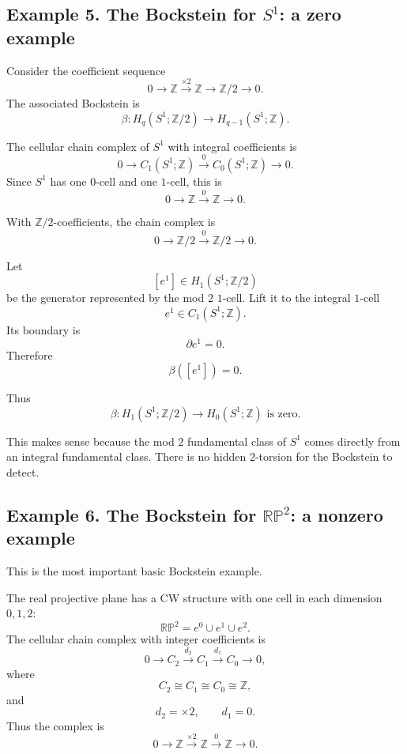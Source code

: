 \documentclass[12pt,a4paper]{article}
\theoremstyle{notespace}
\begin{document}
\subsection{Example 5. The Bockstein for \texorpdfstring{\(S^1\)}{S1}: a zero example}

Consider the coefficient sequence
\[
0\longrightarrow \mathbb Z
\xrightarrow{\times 2}
\mathbb Z
\longrightarrow
\mathbb Z/2
\longrightarrow 0.
\]
The associated Bockstein is
\[
\beta:H_q(S^1;\mathbb Z/2)
\longrightarrow
H_{q-1}(S^1;\mathbb Z).
\]

The cellular chain complex of \(S^1\) with integral coefficients is
\[
0
\longrightarrow
C_1(S^1;\mathbb Z)
\xrightarrow{0}
C_0(S^1;\mathbb Z)
\longrightarrow
0.
\]
Since \(S^1\) has one \(0\)-cell and one \(1\)-cell, this is
\[
0
\longrightarrow
\mathbb Z
\xrightarrow{0}
\mathbb Z
\longrightarrow
0.
\]

With \(\mathbb Z/2\)-coefficients, the chain complex is
\[
0
\longrightarrow
\mathbb Z/2
\xrightarrow{0}
\mathbb Z/2
\longrightarrow
0.
\]

Let
\[
[e^1]\in H_1(S^1;\mathbb Z/2)
\]
be the generator represented by the mod \(2\) \(1\)-cell. Lift it to the integral \(1\)-cell
\[
e^1\in C_1(S^1;\mathbb Z).
\]
Its boundary is
\[
\partial e^1=0.
\]
Therefore
\[
\beta([e^1])=0.
\]

Thus
\[
\boxed{
	\beta:H_1(S^1;\mathbb Z/2)\longrightarrow H_0(S^1;\mathbb Z)
	\text{ is zero.}
}
\]

This makes sense because the mod \(2\) fundamental class of \(S^1\) comes directly from an integral fundamental class. There is no hidden \(2\)-torsion for the Bockstein to detect.

\subsection{Example 6. The Bockstein for \texorpdfstring{\(\mathbb{RP}^2\)}{RP2}: a nonzero example}

This is the most important basic Bockstein example.

The real projective plane has a CW structure with one cell in each dimension \(0,1,2\):
\[
\mathbb{RP}^2=e^0\cup e^1\cup e^2.
\]
The cellular chain complex with integer coefficients is
\[
0
\longrightarrow
C_2
\xrightarrow{d_2}
C_1
\xrightarrow{d_1}
C_0
\longrightarrow
0,
\]
where
\[
C_2\cong C_1\cong C_0\cong\mathbb Z,
\]
and
\[
d_2=\times 2,
\qquad
d_1=0.
\]
Thus the complex is
\[
0
\longrightarrow
\mathbb Z
\xrightarrow{\times 2}
\mathbb Z
\xrightarrow{0}
\mathbb Z
\longrightarrow
0.
\]
\end{document}
